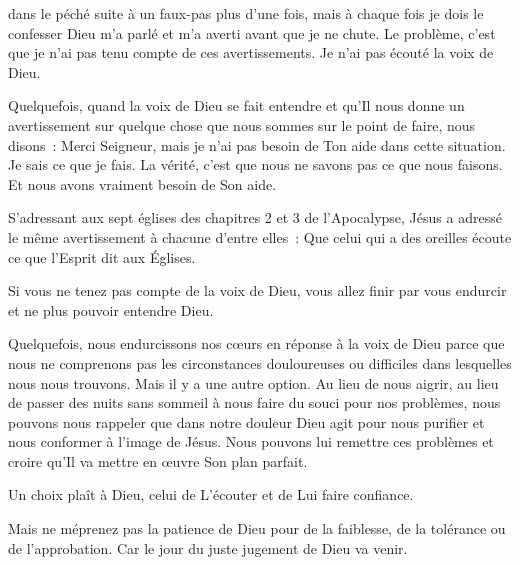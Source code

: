 


 dans le péché suite à un faux-pas
 plus d'une fois, mais à chaque fois \ocadr je dois le confesser \fcadr{}
 Dieu m'a parlé et m'a averti avant que je ne chute.
 Le problème, c'est que je n'ai pas tenu compte de ces avertissements.
 Je n'ai pas écouté la voix de Dieu. 

Quelquefois, quand la voix de Dieu se fait entendre et qu'Il nous donne
 un avertissement sur quelque chose que nous sommes sur le point de faire,
 nous disons~:
 \og Merci Seigneur, mais je n'ai pas besoin de Ton aide dans cette situation.
 Je sais ce que je fais. \fg{}
 La vérité, c'est que nous ne savons pas ce que nous faisons.
 Et nous avons vraiment besoin de Son aide. 

S'adressant aux sept églises des chapitres 2 et 3 de l'Apocalypse,
 Jésus a adressé le même avertissement à chacune d'entre elles~:
 \og Que celui qui a des oreilles écoute
 ce que l'Esprit dit aux Églises. \fg{}


Si vous ne tenez pas compte de la voix de Dieu,
 vous allez finir par vous endurcir et ne plus pouvoir entendre Dieu.

Quelquefois, nous endurcissons nos cœurs en réponse à la voix de Dieu
 parce que nous ne comprenons pas les circonstances douloureuses ou difficiles
 dans lesquelles nous nous trouvons.
 Mais il y a une autre option. Au lieu de nous aigrir,
 au lieu de passer des nuits sans sommeil à nous faire du souci
 pour nos problèmes, nous pouvons nous rappeler que dans notre douleur Dieu
 agit pour nous purifier et nous conformer à l'image de Jésus.
 Nous pouvons lui remettre ces problèmes et croire qu'Il va mettre
 en œuvre Son plan parfait. 

Un choix plaît à Dieu, celui de L'écouter et de Lui faire confiance. 

Mais ne méprenez pas la patience de Dieu pour de la faiblesse,
 de la tolérance ou de l'approbation.
 Car le jour du juste jugement de Dieu va venir.

\dvrule




